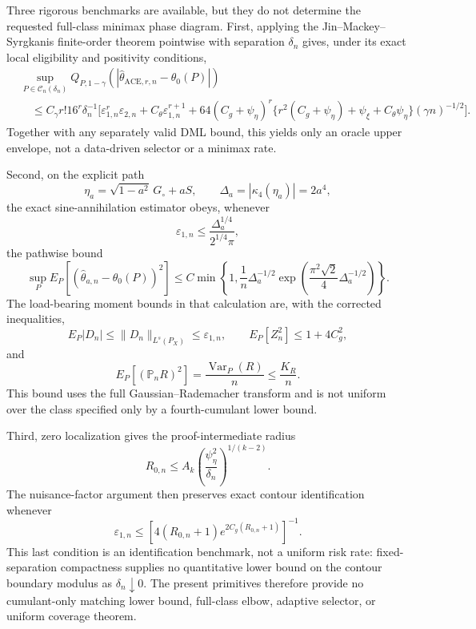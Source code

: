 Three rigorous benchmarks are available, but they do not determine the requested full-class minimax phase diagram.  First, applying the Jin--Mackey--Syrgkanis finite-order theorem pointwise with separation \(\delta_n\) gives, under its exact local eligibility and positivity conditions,
\[
 \begin{aligned}
 &\sup_{P\in\mathcal C_n(\delta_n)}
 Q_{P,1-\gamma}
 \!\left(|\widehat\theta_{\mathrm{ACE},r,n}-\theta_0(P)|\right)\\
 &\quad\le C_{\gamma}r!16^r\delta_n^{-1}
 \Big[
  \varepsilon_{1,n}^r\varepsilon_{2,n}
  +C_{\theta}\varepsilon_{1,n}^{r+1}
  +64(C_g+\psi_{\eta})^r
  \{r^2(C_g+\psi_{\eta})+\psi_{\xi}+C_{\theta}\psi_{\eta}\}
  (\gamma n)^{-1/2}
 \Big].
 \end{aligned}
\]
Together with any separately valid DML bound, this yields only an oracle upper envelope, not a data-driven selector or a minimax rate.

Second, on the explicit path
\[
 \eta_a=\sqrt{1-a^2}\,G_{\circ}+aS,
 \qquad
 \Delta_a=|\kappa_4(\eta_a)|=2a^4,
\]
the exact sine-annihilation estimator obeys, whenever
\[
 \varepsilon_{1,n}
 \le\frac{\Delta_a^{1/4}}{2^{1/4}\pi},
\]
the pathwise bound
\[
 \sup_P E_P[(\widehat\theta_{a,n}-\theta_0(P))^2]
 \le C\min\!\left\{
  1,\frac1n\Delta_a^{-1/2}
  \exp\!\left(\frac{\pi^2\sqrt2}{4}\Delta_a^{-1/2}\right)
 \right\}.
\]
The load-bearing moment bounds in that calculation are, with the corrected inequalities,
\[
 E_P|D_n|
 \le\|D_n\|_{L^s(P_X)}
 \le\varepsilon_{1,n},
 \qquad
 E_P[Z_n^2]\le1+4C_g^2,
\]
and
\[
 E_P[(\mathbb P_nR)^2]
 =\frac{\operatorname{Var}_P(R)}{n}
 \le\frac{K_R}{n}.
\]
This bound uses the full Gaussian--Rademacher transform and is not uniform over the class specified only by a fourth-cumulant lower bound.

Third, zero localization gives the proof-intermediate radius
\[
 R_{0,n}\le A_k
 \left(\frac{\psi_{\eta}^2}{\delta_n}\right)^{1/(k-2)}.
\]
The nuisance-factor argument then preserves exact contour identification whenever
\[
 \varepsilon_{1,n}
 \le
 \left[4(R_{0,n}+1)e^{2C_g(R_{0,n}+1)}\right]^{-1}.
\]
This last condition is an identification benchmark, not a uniform risk rate: fixed-separation compactness supplies no quantitative lower bound on the contour boundary modulus as \(\delta_n\downarrow0\).  The present primitives therefore provide no cumulant-only matching lower bound, full-class elbow, adaptive selector, or uniform coverage theorem.